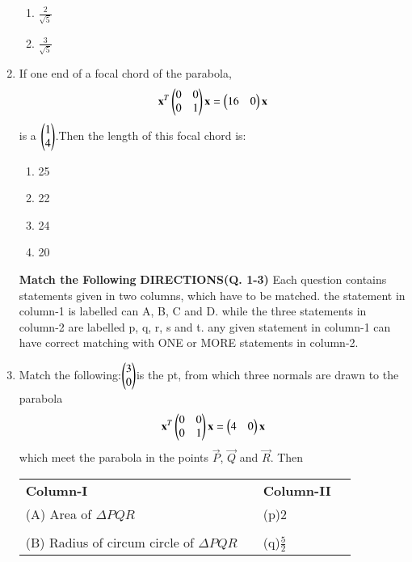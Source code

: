 \begin{enumerate}[label=\arabic*.,ref=\thesubsection.\theenumi]
\begin{enumerate}
    \item $\frac{2}{\sqrt{5}}$
    \item $\frac{3}{\sqrt{5}}$
    \end{enumerate}
    \item If one end of a focal chord of the parabola,
    \begin{align}
    \mathbf{x}^T\begin{pmatrix}0&0\\0&1\end{pmatrix}\mathbf{x}=\begin{pmatrix}16&0\end{pmatrix}\mathbf{x}
    \end{align} is a $\begin{pmatrix}1\\4\end{pmatrix}$.Then the length of this focal chord is:
    \begin{enumerate}
    \item 25
    \item 22
    \item 24
    \item 20
    \end{enumerate}
    \onecolumn
    {\textbf{Match the Following}}
	\textbf{DIRECTIONS(Q. 1-3)}
    Each question contains statements given in two columns, which have to be matched. the statement in column-1 is labelled can A, B, C and D. while the three statements in column-2 are labelled p, q, r, s and t. any given statement in column-1 can have correct matching with ONE or MORE statements in column-2. 
    \item Match the following:$\begin{pmatrix}3\\0\end{pmatrix}$is the pt, from which three normals are drawn to the parabola
    \begin{align}
    \mathbf{x}^T\begin{pmatrix}0&0\\0&1\end{pmatrix}\mathbf{x}=\begin{pmatrix}4&0\end{pmatrix}\mathbf{x}
    \end{align} which meet the parabola in the points $\vec{P}$, $\vec{Q}$ and $\vec{R}$. Then\\
  \begin{tabular}{llll}
    \textbf{Column-I}& \enspace &\textbf{Column-II}\\
    (A) Area of $\Delta PQR$ &\enspace &(p)$2$\\
    &&&\\
    (B) Radius of circum circle of $\Delta PQR$&\enspace & (q)$\frac{5}{2}$\\

\end{tabular}
\end{enumerate}
